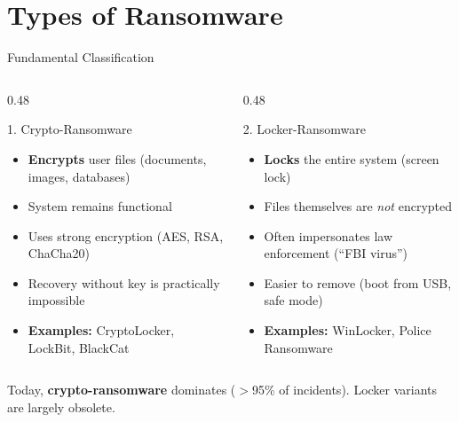 \documentclass[aspectratio=169]{beamer}
\begin{document}
\section{Types of Ransomware}

\begin{frame}{Fundamental Classification}
  \begin{columns}[T]
    \begin{column}{0.48\textwidth}
      \begin{block}{1. Crypto-Ransomware}
        \small
        \begin{itemize}
          \item \textbf{Encrypts} user files (documents, images, databases)
          \item System remains functional
          \item Uses strong encryption (AES, RSA, ChaCha20)
          \item Recovery without key is practically impossible
          \item \textbf{Examples:} CryptoLocker, LockBit, BlackCat
        \end{itemize}
      \end{block}
    \end{column}
    \begin{column}{0.48\textwidth}
      \begin{block}{2. Locker-Ransomware}
        \small
        \begin{itemize}
          \item \textbf{Locks} the entire system (screen lock)
          \item Files themselves are \textit{not} encrypted
          \item Often impersonates law enforcement (``FBI virus'')
          \item Easier to remove (boot from USB, safe mode)
          \item \textbf{Examples:} WinLocker, Police Ransomware
        \end{itemize}
      \end{block}
    \end{column}
  \end{columns}

  \vspace{0.8em}
  \begin{center}
    \textcolor{textgray}{\footnotesize Today, \textbf{crypto-ransomware} dominates ($>$95\% of incidents). Locker variants are largely obsolete.}
  \end{center}
\end{frame}
\end{document}
